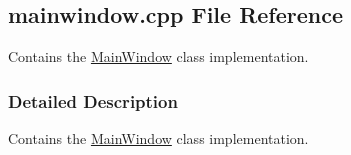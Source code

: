 \hypertarget{a00017}{}\subsection{mainwindow.\+cpp File Reference}
\label{a00017}


Contains the \hyperlink{a00005}{Main\+Window} class implementation.  




\subsubsection{Detailed Description}
Contains the \hyperlink{a00005}{Main\+Window} class implementation. 

